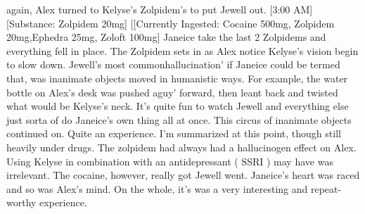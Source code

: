 \documentclass[12pt]{book}
\begin{document}
again, Alex turned to Kelyse's Zolpidem's to put Jewell out. [3:00 AM] [Substance: Zolpidem 20mg] [[Currently Ingested: Cocaine 500mg, Zolpidem 20mg,Ephedra 25mg, Zoloft 100mg] Janeice take the last 2 Zolpidems and everything fell in place. The Zolpidem sets in as Alex notice Kelyse's vision begin to slow down. Jewell's most commonhallucination' if Janeice could be termed that, was inanimate objects moved in humanistic ways. For example, the water bottle on Alex's desk was pushed aguy' forward, then leant back and twisted what would be Kelyse's neck. It's quite fun to watch Jewell and everything else just sorta of do Janeice's own thing all at once. This circus of inanimate objects continued on. Quite an experience. I'm summarized at this point, though still heavily under drugs. The zolpidem had always had a hallucinogen effect on Alex. Using Kelyse in combination with an antidepressant ( SSRI ) may have was irrelevant. The cocaine, however, really got Jewell went. Janeice's heart was raced and so was Alex's mind. On the whole, it's was a very interesting and repeat-worthy experience.
\end{document}
